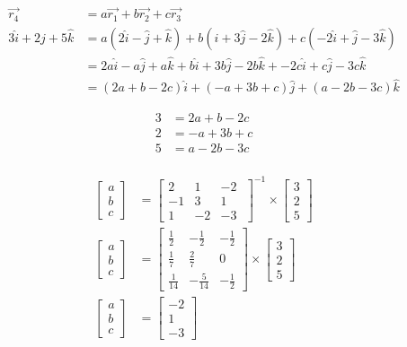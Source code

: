 \documentclass[11pt,letterpaper]{article}
\begin{document}
\begin{enumerate}
\begin{align}
    \vec{r_{4}} &= a\vec{r_{1}} + b\vec{r_{2}} + c\vec{r_{3}}\\
    3\hat{i}+2\hat{j}+5\hat{k} &= a(2\hat{i}-\hat{j}+\hat{k}) + b(\hat{i}+3\hat{j}-2\hat{k}) + c(-2\hat{i}+\hat{j}-3\hat{k}) \\
    &= 2a\hat{i}-a\hat{j}+a\hat{k} + b\hat{i}+3b\hat{j}-2b\hat{k} + -2c\hat{i}+c\hat{j}-3c\hat{k} \\
    &= (2a+b-2c)\hat{i} + (-a+3b+c)\hat{j} + (a-2b-3c)\hat{k}
\end{align}

\begin{align}
    3&=2a+b-2c \\
    2&=-a+3b+c \\
    5&=a-2b-3c \\
\end{align}

\begin{align}
	\begin{bmatrix}
		a \\
		b \\
		c
	\end{bmatrix}
    &=
	\begin{bmatrix}
		2 & 1 & -2 \,\, \\
	-1 & 3 & 1 \\
	1 & -2 & -3
	\end{bmatrix}^{-1}
	\times
	\begin{bmatrix}
		3 \\
		2 \\
		5
	\end{bmatrix} \\
	\begin{bmatrix}
		a \\
		b \\
		c
	\end{bmatrix}
    &=
	\begin{bmatrix}
		\frac{1}{2} & -\frac{1}{2} & -\frac{1}{2} \\
	    \frac{1}{7} & \frac{2}{7} & 0 \\
	    \frac{1}{14} & -\frac{5}{14} & -\frac{1}{2}
	\end{bmatrix}
	\times
	\begin{bmatrix}
		3 \\
		2 \\
		5
	\end{bmatrix} \\
	\begin{bmatrix}
		a \\
		b \\
		c
	\end{bmatrix}
    &=
	\begin{bmatrix}
		-2 \\
		1 \\
		-3
	\end{bmatrix}
\end{align}


\end{enumerate}
\end{document}
